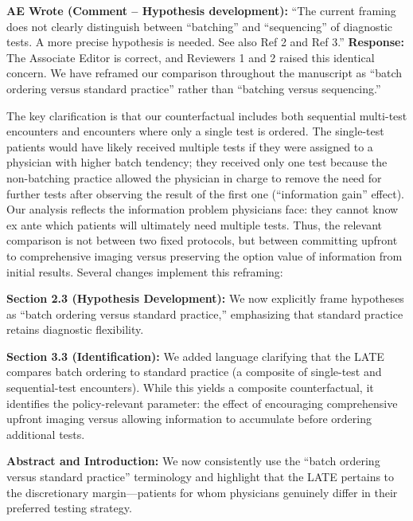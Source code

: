 \documentclass[11pt]{article}
\newenvironment{quote2}
{ \bigskip
\noindent
         \small\em
         \baselineskip=14pt
}
\newcommand{\1}{\hbox{\rm 1\kern-.35em 1}}
\begin{document}
\begin{quote2}
\textbf{AE Wrote (Comment – Hypothesis development):} 
\noindent``The current framing does not clearly distinguish between ``batching'' and ``sequencing'' of diagnostic tests. A more precise hypothesis is needed. See also Ref 2 and Ref 3.''
\end{quote2}

\noindent\textbf{Response:} \color{blue}The Associate Editor is correct, and Reviewers 1 and 2 raised this identical concern. We have reframed our comparison throughout the manuscript as ``batch ordering versus standard practice'' rather than ``batching versus sequencing.''

The key clarification is that our counterfactual includes both sequential multi-test encounters and encounters where only a single test is ordered. The single-test patients would have likely received multiple tests if they were assigned to a physician with higher batch tendency; they received only one test because the non-batching practice allowed the physician in charge to remove the need for further tests after observing the result of the first one (``information gain'' effect). Our analysis reflects the information problem physicians face: they cannot know ex ante which patients will ultimately need multiple tests. Thus, the relevant comparison is not between two fixed protocols, but between committing upfront to comprehensive imaging versus preserving the option value of information from initial results.
Several changes implement this reframing:

\textbf{Section 2.3 (Hypothesis Development):} We now explicitly frame hypotheses as ``batch ordering versus standard practice,'' emphasizing that standard practice retains diagnostic flexibility.

\textbf{Section 3.3 (Identification):} We added language clarifying that the LATE compares batch ordering to standard practice (a composite of single-test and sequential-test encounters). While this yields a composite counterfactual, it identifies the policy-relevant parameter: the effect of encouraging comprehensive upfront imaging versus allowing information to accumulate before ordering additional tests.

\textbf{Abstract and Introduction:} We now consistently use the ``batch ordering versus standard practice'' terminology and highlight that the LATE pertains to the discretionary margin---patients for whom physicians genuinely differ in their preferred testing strategy.
\end{document}
